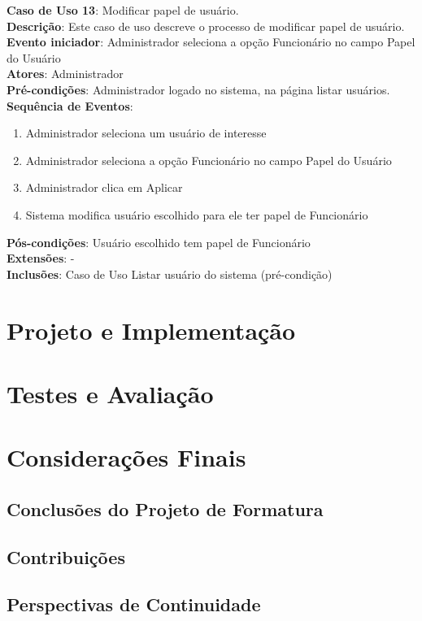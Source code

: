 \documentclass[]{politex}
\begin{document}
\noindent \textbf{Caso de Uso 13}: Modificar papel de usuário. \\
\textbf{Descrição}: Este caso de uso descreve o processo de modificar papel de
usuário. \\
\textbf{Evento iniciador}: Administrador seleciona a opção Funcionário no campo
Papel do Usuário \\
\textbf{Atores}: Administrador \\
\textbf{Pré-condições}: Administrador logado no sistema, na página listar
usuários. \\
\textbf{Sequência de Eventos}:
\begin{enumerate}
\item Administrador seleciona um usuário de interesse
\item Administrador seleciona a opção Funcionário no campo Papel do Usuário
\item Administrador clica em Aplicar
\item Sistema modifica usuário escolhido para ele ter papel de Funcionário
\end{enumerate}
\textbf{Pós-condições}: Usuário escolhido tem papel de Funcionário \\
\textbf{Extensões}: - \\
\textbf{Inclusões}: Caso de Uso Listar usuário do sistema (pré-condição) \\


\chapter{Projeto e Implementação}


\chapter{Testes e Avaliação}


\chapter{Considerações Finais}
\section{Conclusões do Projeto de Formatura}
\section{Contribuições}
\section{Perspectivas de Continuidade}
\end{document}
